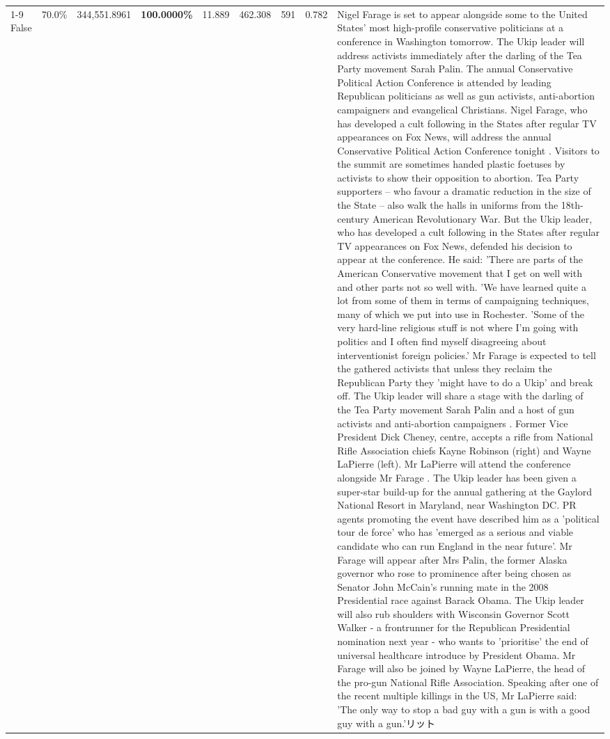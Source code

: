 \begin{table}[H]
\begin{tabular}{lllrlllll}
\cline{1-9}
False & 70.0\% & 344,551.8961 & \bfseries \color{red} 100.0000\% & 11.889 & 462.308 & 591 & 0.782 & Nigel Farage is set to appear alongside some to the United States' most high-profile conservative politicians at a conference in Washington tomorrow. The Ukip leader will address activists immediately after the darling of the Tea Party movement Sarah Palin. The annual Conservative Political Action Conference is attended by leading Republican politicians as well as gun activists, anti-abortion campaigners and evangelical Christians. Nigel Farage, who has developed a cult following in the States after regular TV appearances on Fox News, will address the annual Conservative Political Action Conference tonight . Visitors to the summit are sometimes handed plastic foetuses by activists to show their opposition to abortion. Tea Party supporters – who favour a dramatic reduction in the size of the State – also walk the halls in uniforms from the 18th-century American Revolutionary War. But the Ukip leader, who has developed a cult following in the States after regular TV appearances on Fox News, defended his decision to appear at the conference. He said: 'There are parts of the American Conservative movement that I get on well with and other parts not so well with. 'We have learned quite a lot from some of them in terms of campaigning techniques, many of which we put into use in Rochester. 'Some of the very hard-line religious stuff is not where I'm going with politics and I often find myself disagreeing about interventionist foreign policies.' Mr Farage is expected to tell the gathered activists that unless they reclaim the Republican Party they 'might have to do a Ukip' and break off. The Ukip leader will share a stage with the darling of the Tea Party movement Sarah Palin and a host of gun activists and anti-abortion campaigners . Former Vice President Dick Cheney, centre, accepts a rifle from National Rifle Association chiefs Kayne Robinson (right) and Wayne LaPierre (left). Mr LaPierre will attend the conference alongside Mr Farage . The Ukip leader has been given a super-star build-up for the annual gathering at the Gaylord National Resort in Maryland, near Washington DC. PR agents promoting the event have described him as a 'political tour de force' who has 'emerged as a serious and viable candidate who can run England in the near future'. Mr Farage will appear after Mrs Palin, the former Alaska governor who rose to prominence after being chosen as Senator John McCain's running mate in the 2008 Presidential race against Barack Obama. The Ukip leader will also rub shoulders with Wisconsin Governor Scott Walker - a frontrunner for the Republican Presidential nomination next year - who wants to 'prioritise' the end of universal healthcare introduce by President Obama. Mr Farage will also be joined by Wayne LaPierre, the head of the pro-gun National Rifle Association. Speaking after one of the recent multiple killings in the US, Mr LaPierre said: 'The only way to stop a bad guy with a gun is with a good guy with a gun.'リット \\

\end{tabular}
\end{table}
